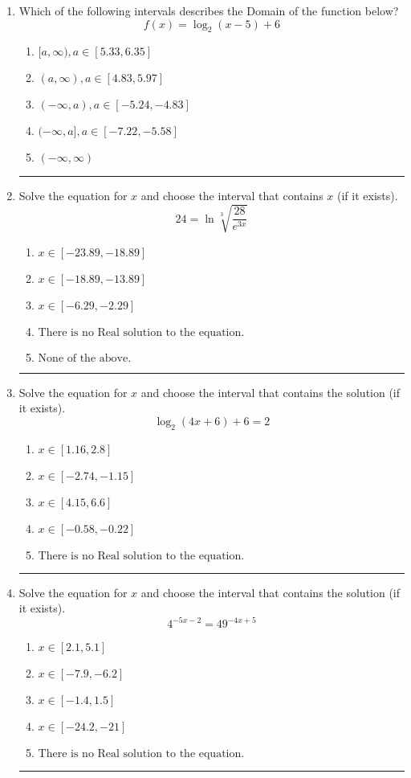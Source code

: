 \documentclass[14pt]{extbook}
\newcommand{\litem}[1]{\item#1\hspace*{-1cm}\rule{\textwidth}{0.4pt}}
\begin{document}
\begin{enumerate}
{\begin{enumerate}[label=\Alph*.]
\end{enumerate} }
\litem{
Which of the following intervals describes the Domain of the function below?\[ f(x) = \log_2{(x-5)}+6 \]\begin{enumerate}[label=\Alph*.]
\item \( [a, \infty), a \in [5.33, 6.35] \)
\item \( (a, \infty), a \in [4.83, 5.97] \)
\item \( (-\infty, a), a \in [-5.24, -4.83] \)
\item \( (-\infty, a], a \in [-7.22, -5.58] \)
\item \( (-\infty, \infty) \)

\end{enumerate} }
\litem{
 Solve the equation for $x$ and choose the interval that contains $x$ (if it exists).\[  24 = \ln{\sqrt[3]{\frac{28}{e^{3x}}}} \]\begin{enumerate}[label=\Alph*.]
\item \( x \in [-23.89, -18.89] \)
\item \( x \in [-18.89, -13.89] \)
\item \( x \in [-6.29, -2.29] \)
\item \( \text{There is no Real solution to the equation.} \)
\item \( \text{None of the above.} \)

\end{enumerate} }
\litem{
Solve the equation for $x$ and choose the interval that contains the solution (if it exists).\[ \log_{2}{(4x+6)}+6 = 2 \]\begin{enumerate}[label=\Alph*.]
\item \( x \in [1.16, 2.8] \)
\item \( x \in [-2.74, -1.15] \)
\item \( x \in [4.15, 6.6] \)
\item \( x \in [-0.58, -0.22] \)
\item \( \text{There is no Real solution to the equation.} \)

\end{enumerate} }
\litem{
Solve the equation for $x$ and choose the interval that contains the solution (if it exists).\[ 4^{-5x-2} = 49^{-4x+5} \]\begin{enumerate}[label=\Alph*.]
\item \( x \in [2.1, 5.1] \)
\item \( x \in [-7.9, -6.2] \)
\item \( x \in [-1.4, 1.5] \)
\item \( x \in [-24.2, -21] \)
\item \( \text{There is no Real solution to the equation.} \)


\end{enumerate}}
\end{enumerate}
\end{document}
